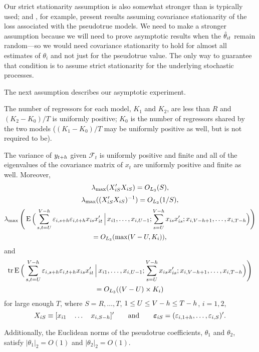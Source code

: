 \documentclass[12pt]{article}
\begin{document}
Our strict stationarity assumption is also somewhat stronger than is
typically used; \citet{Wes:96} and \citet{Mcc:07}, for example,
present results assuming covariance stationarity of the loss
associated with the pseudotrue models. We need to make a stronger
assumption because we will need to prove asymptotic results when the
$\hat\theta_{it}$ remain random---so we would need covariance stationarity to
hold for almost all estimates of $\theta_i$ and not just for the
pseudotrue value. The only way to guarantee that condition is to
assume strict stationarity for the underlying stochastic processes.

The next assumption describes our asymptotic experiment.
\begin{asmp}\label{asmp-2}
  The number of regressors for each model, $K_1$ and $K_2$, are less
  than $R$ and $(K_2-K_0)/T$ is uniformly positive;
  $K_0$ is the number of regressors shared by the two models ($(K_1 - K_0)/T$
  may be uniformly positive as well, but is not required to be).

  The variance of $y_{t+h}$ given $\mathcal{F}_t$ is uniformly
  positive and finite and all of the eigenvalues of the covariance
  matrix of $x_t$ are uniformly positive and finite as well.
  Moreover,
  \begin{equation}
    \operatorname{\lambda}_{\max}(X_{iS}'X_{iS}) = O_{L_3}(S),
  \end{equation}
  \begin{equation}
    \operatorname{\lambda}_{\max}((X_{iS}'X_{iS})^{-1}) = O_{L_3}(1/S),
  \end{equation}
  \begin{multline}\label{eq:28}
    \operatorname{\lambda}_{\max}\Bigg(\operatorname{E}\Big(
    \sum_{s,t=U}^{V-h} \varepsilon_{i,s+h} \varepsilon_{i,t+h} x_{is}x_{it}'
    \,\Big|\,
    x_{i1},\dots,x_{i,U-1};
    \sum_{s=U}^{V-h} x_{is} x_{is}';
    x_{i,V-h+1},\dots,x_{i,T-h}
    \Big)\Bigg) \\
    = O_{L_3}(\max(V-U, K_i)),
  \end{multline}
  and
  \begin{multline}\label{eq:8}
    \operatorname{tr} \operatorname{E}\Big(
    \sum_{s,t=U}^{V-h} \varepsilon_{i,s+h} \varepsilon_{i,t+h} x_{is}x_{it}'
    \,\Big|\,
    x_{i1},\dots,x_{i,U-1};
    \sum_{s=U}^{V-h} x_{is} x_{is}';
    x_{i,V-h+1},\dots,x_{i,T-h}
    \Big)\Bigg) \\
    = O_{L_3}((V-U) \times K_i)
  \end{multline}
  for large enough $T$, where $S = R,\dots,T$, $1 \leq U \leq V - h
  \leq T - h$, $i = 1,2$,
  \[ X_{iS} \equiv [x_{i1} \quad \dots \quad x_{i,S-h}]' \qquad
  \text{and} \qquad \boldsymbol{\varepsilon}_{iS} = (\varepsilon_{i,1+h}, \dots, \varepsilon_{i,S})'.\]

  Additionally, the Euclidean norms of the pseudotrue coefficients,
  $\theta_1$ and $\theta_2$, satisfy $|\theta_1|_2 = O(1)$ and
  $|\theta_2|_2 = O(1)$.
\end{asmp}
\end{document}
